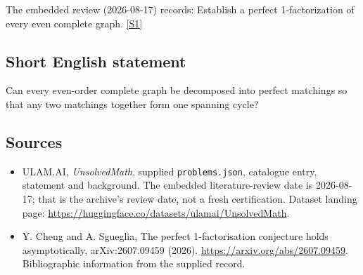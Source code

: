 \documentclass[11pt,a4paper]{article}
\newcommand{\sref}[2]{\hyperlink{source:#1:#2}{[S#2]}}
\begin{document}
The embedded review (2026-08-17) records: Establish a perfect 1-factorization of every even complete graph. \sref{statement}{1}

\subsection{Short English statement}

Can every even-order complete graph be decomposed into perfect matchings so that any two matchings together form one spanning cycle?

\subsection{Sources}

{\small

\begin{itemize}

\item[\hypertarget{source:statement:1}{S1}] ULAM.AI, \emph{UnsolvedMath}, supplied \texttt{problems.json}, catalogue entry, statement and background. The embedded literature-review date is 2026-08-17; that is the archive’s review date, not a fresh certification. Dataset landing page: \url{https://huggingface.co/datasets/ulamai/UnsolvedMath}.

\item[\hypertarget{source:statement:2}{S2}] Y. Cheng and A. Sgueglia, The perfect 1-factorisation conjecture holds asymptotically, arXiv:2607.09459 (2026). \url{https://arxiv.org/abs/2607.09459}. Bibliographic information from the supplied record.

\end{itemize}

}

\label{end:statement}
\end{document}
